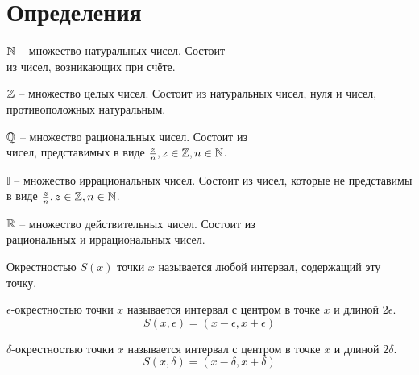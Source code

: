 \section{Определения}


\begin{definition}
    $\mathbb{N}$ -- множество натуральных чисел.
    Состоит \\ из чисел, возникающих при счёте. 
\end{definition}


\begin{definition}
    $\mathbb{Z}$ -- множество целых чисел.
    Состоит из натуральных чисел, нуля и чисел, противоположных натуральным.
\end{definition}


\begin{definition}
    $\mathbb{Q}$ -- множество рациональных чисел. 
    Состоит из \\ чисел, представимых в виде $\frac{z}{n}, z \in \mathbb{Z}, n \in \mathbb{N}$.
\end{definition}


\begin{definition}
    $\mathbb{I}$ -- множество иррациональных чисел.
    Состоит из чисел, которые не представимы в виде $\frac{z}{n}, z \in \mathbb{Z}, n \in \mathbb{N}$. 
\end{definition}


\begin{definition}
    $\mathbb{R}$ -- множество действительных чисел.
    Состоит из \\ рациональных и иррациональных чисел.
\end{definition}


\begin{definition}
    Окрестностью $S(x)$ точки $x$ называется любой интервал, содержащий эту точку. 
\end{definition}


\begin{definition}
    $\epsilon$-окрестностью точки $x$ называется интервал с центром в точке $x$ и длиной $2 \epsilon$. \[
        S(x, \epsilon) = (x-\epsilon, x+\epsilon)
    \]
\end{definition}


\begin{definition}
    $\delta$-окрестностью точки $x$ называется интервал с центром в точке $x$ и длиной $2 \delta$.  \[
        S(x, \delta) = (x-\delta, x+\delta)
    \]
\end{definition}


